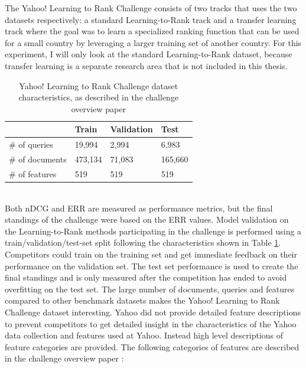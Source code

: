 The Yahoo! Learning to Rank Challenge consists of two tracks that uses the two datasets respectively: a standard Learning-to-Rank track and a transfer learning track where the goal was to learn a specialized ranking function that can be used for a small country by leveraging a larger training set of another country. For this experiment, I will only look at the standard Learning-to-Rank dataset, because transfer learning is a separate research area that is not included in this thesis.\\
\begin{table}[!h]
\begin{tabular}{l|lll}
 & Train & Validation & Test \\ 
 \hline
\# of queries & 19,994 & 2,994 & 6,983 \\ 
\# of documents & 473,134 & 71,083 & 165,660 \\ 
\# of features & 519 & 519 & 519 \\ 
\end{tabular}
\caption{Yahoo! Learning to Rank Challenge dataset characteristics, as described in the challenge overview paper \cite{Chapelle2011a}}
\label{tab:yahoo_characteristics}
\end{table}\\
Both \ac{nDCG} and \ac{ERR} are measured as performance metrics, but the final standings of the challenge were based on the \ac{ERR} values. Model validation on the Learning-to-Rank methods participating in the challenge is performed using a train/validation/test-set split following the characteristics shown in Table \ref{tab:yahoo_characteristics}. Competitors could train on the training set and get immediate feedback on their performance on the validation set. The test set performance is used to create the final standings and is only measured after the competition has ended to avoid overfitting on the test set. The large number of documents, queries and features compared to other benchmark datasets makes the Yahoo! Learning to Rank Challenge dataset interesting. Yahoo did not provide detailed feature descriptions to prevent competitors to get detailed insight in the characteristics of the Yahoo data collection and features used at Yahoo. Instead high level descriptions of feature categories are provided. The following categories of features are described in the challenge overview paper \cite{Chapelle2011a}:\\
